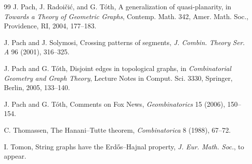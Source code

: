 \documentclass[11pt]{article}
\theoremstyle{plain}
\theoremstyle{definition}
\theoremstyle{remark}
\begin{document}
\begin{thebibliography}{99}
J. Pach, J. Radoi\v{c}i\'c, and G. T\'oth,
A generalization of quasi-planarity,
in \emph{Towards a Theory of Geometric Graphs},
Contemp. Math. 342,
Amer. Math. Soc., Providence, RI, 2004, 177--183.

J. Pach and J. Solymosi,
Crossing patterns of segments,
\emph{J. Combin. Theory Ser. A} 96 (2001), 316--325.

J. Pach and G. T\'oth,
Disjoint edges in topological graphs,
in \emph{Combinatorial Geometry and Graph Theory},
Lecture Notes in Comput. Sci. 3330,
Springer, Berlin, 2005, 133--140.

J. Pach and G. T\'oth,
Comments on Fox News,
\emph{Geombinatorics} 15 (2006), 150--154.

C. Thomassen,
The Hanani--Tutte theorem,
\emph{Combinatorica} 8 (1988), 67--72.

I. Tomon,
String graphs have the Erd\H{o}s--Hajnal property,
\emph{J. Eur. Math. Soc.}, to appear.

\end{thebibliography}
\end{document}
